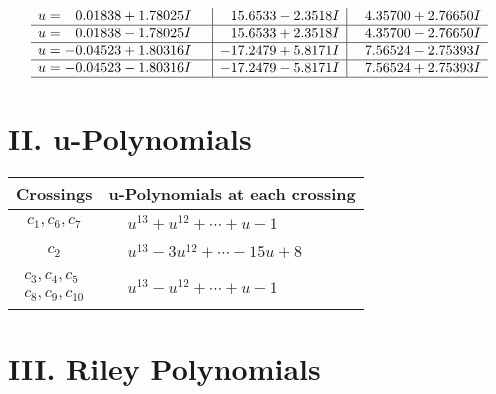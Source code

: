 \documentclass[1p]{elsarticle_modified}
\theoremstyle{definition}
\begin{document}
$$\begin{array}{c|c|c}
\begin{aligned}
u &= \phantom{-}0.01838 + 1.78025 I\end{aligned}
 & \phantom{-}15.6533 - 2.3518 I & \phantom{-}4.35700 + 2.76650 I \\ \hline\begin{aligned}
u &= \phantom{-}0.01838 - 1.78025 I\end{aligned}
 & \phantom{-}15.6533 + 2.3518 I & \phantom{-}4.35700 - 2.76650 I \\ \hline\begin{aligned}
u &= -0.04523 + 1.80316 I\end{aligned}
 & -17.2479 + 5.8171 I & \phantom{-}7.56524 - 2.75393 I \\ \hline\begin{aligned}
u &= -0.04523 - 1.80316 I\end{aligned}
 & -17.2479 - 5.8171 I & \phantom{-}7.56524 + 2.75393 I\\
 \hline 
 \end{array}$$\newpage
\newpage\renewcommand{\arraystretch}{1}
\centering \section*{ II. u-Polynomials}
\begin{tabular}{m{50pt}|m{274pt}}
Crossings & \hspace{64pt}u-Polynomials at each crossing \\
\hline $$\begin{aligned}c_{1},c_{6},c_{7}\end{aligned}$$&$\begin{aligned}
&u^{13}+u^{12}+\cdots+u-1
\end{aligned}$\\
\hline $$\begin{aligned}c_{2}\end{aligned}$$&$\begin{aligned}
&u^{13}-3 u^{12}+\cdots-15 u+8
\end{aligned}$\\
\hline $$\begin{aligned}c_{3},c_{4},c_{5}\\c_{8},c_{9},c_{10}\end{aligned}$$&$\begin{aligned}
&u^{13}- u^{12}+\cdots+u-1
\end{aligned}$\\
\hline
\end{tabular}\newpage\renewcommand{\arraystretch}{1}
\centering \section*{ III. Riley Polynomials}
\end{document}
